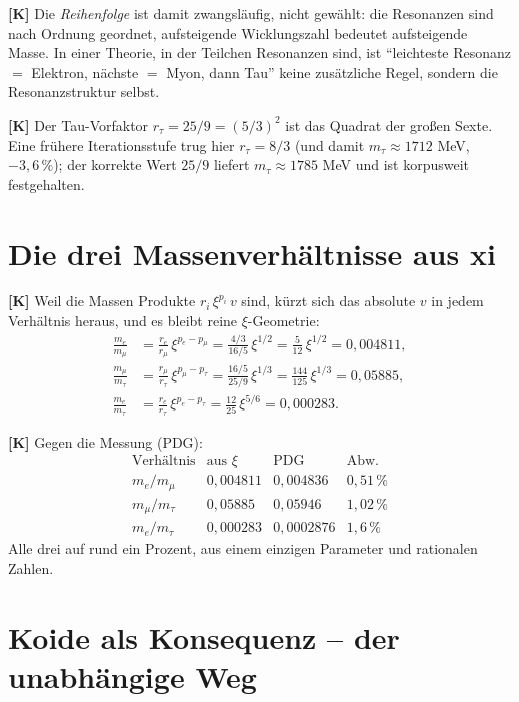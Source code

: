 \textbf{[K]} Die \emph{Reihenfolge} ist damit zwangsläufig, nicht gewählt: die
Resonanzen sind nach Ordnung geordnet, aufsteigende Wicklungszahl bedeutet
aufsteigende Masse. In einer Theorie, in der Teilchen Resonanzen sind, ist
\enquote{leichteste Resonanz $=$ Elektron, nächste $=$ Myon, dann Tau} keine
zusätzliche Regel, sondern die Resonanzstruktur selbst.

\textbf{[K]} Der Tau-Vorfaktor $r_\tau = 25/9 = (5/3)^2$ ist das Quadrat der
großen Sexte. Eine frühere Iterationsstufe trug hier $r_\tau = 8/3$ (und damit
$m_\tau\approx1712$ MeV, $-3{,}6\,\%$); der korrekte Wert $25/9$ liefert
$m_\tau\approx1785$ MeV und ist korpusweit festgehalten.

\section{Die drei Massenverhältnisse aus xi}

\textbf{[K]} Weil die Massen Produkte $r_i\,\xi^{p_i}\,v$ sind, kürzt sich das
absolute $v$ in jedem Verhältnis heraus, und es bleibt reine $\xi$-Geometrie:
\begin{align*}
  \frac{m_e}{m_\mu} &= \frac{r_e}{r_\mu}\,\xi^{p_e-p_\mu}
    = \frac{4/3}{16/5}\,\xi^{1/2} = \frac{5}{12}\,\xi^{1/2} = 0{,}004811, \\
  \frac{m_\mu}{m_\tau} &= \frac{r_\mu}{r_\tau}\,\xi^{p_\mu-p_\tau}
    = \frac{16/5}{25/9}\,\xi^{1/3} = \frac{144}{125}\,\xi^{1/3} = 0{,}05885, \\
  \frac{m_e}{m_\tau} &= \frac{r_e}{r_\tau}\,\xi^{p_e-p_\tau}
    = \frac{12}{25}\,\xi^{5/6} = 0{,}000283.
\end{align*}

\textbf{[K]} Gegen die Messung (PDG):
\[
  \begin{array}{lccc}
    \text{Verhältnis} & \text{aus } \xi & \text{PDG} & \text{Abw.} \\[2pt]
    m_e/m_\mu   & 0{,}004811 & 0{,}004836 & 0{,}51\,\% \\
    m_\mu/m_\tau & 0{,}05885 & 0{,}05946 & 1{,}02\,\% \\
    m_e/m_\tau  & 0{,}000283 & 0{,}0002876 & 1{,}6\,\%
  \end{array}
\]
Alle drei auf rund ein Prozent, aus einem einzigen Parameter und rationalen
Zahlen.

\section{Koide als Konsequenz -- der unabhängige Weg}

